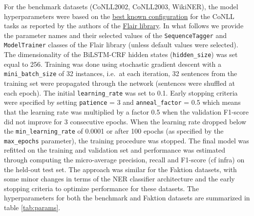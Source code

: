 \documentclass[12pt,a4paper,]{book}
\begin{document}
For the benchmark datasets (CoNLL2002, CoNLL2003, WikiNER), the model hyperparameters were based on the \href{https://github.com/flairNLP/flair/blob/master/resources/docs/EXPERIMENTS.md}{best known configuration} for the CoNLL tasks as reported by the authors of the \href{https://github.com/flairNLP/flair}{Flair library}. In what follows we provide the parameter names and their selected values of the \texttt{SequenceTagger} and \texttt{ModelTrainer} classes of the Flair library (unless default values were selected). The dimensionality of the BiLSTM-CRF hidden states (\texttt{hidden\_size}) was set equal to 256. Training was done using stochastic gradient descent with a \texttt{mini\_batch\_size} of 32 instances, i.e.~at each iteration, 32 sentences from the training set were propagated through the network (sentences were shuffled at each epoch). The initial \texttt{learning\_rate} was set to 0.1. Early stopping criteria were specified by setting \texttt{patience} = 3 and \texttt{anneal\_factor} = 0.5 which means that the learning rate was multiplied by a factor 0.5 when the validation F1-score did not improve for 3 consecutive epochs. When the learning rate dropped below the \texttt{min\_learning\_rate} of 0.0001 or after 100 epochs (as specified by the \texttt{max\_epochs} parameter), the training procedure was stopped. The final model was refitted on the training and validation set and performance was estimated through computing the micro-average precision, recall and F1-score (cf infra) on the held-out test set. The approach was similar for the Faktion datasets, with some minor changes in terms of the NER classifier architecture and the early stopping criteria to optimize performance for these datasets. The hyperparameters for both the benchmark and Faktion datasets are summarized in table \ref{tab:params}.
\end{document}
